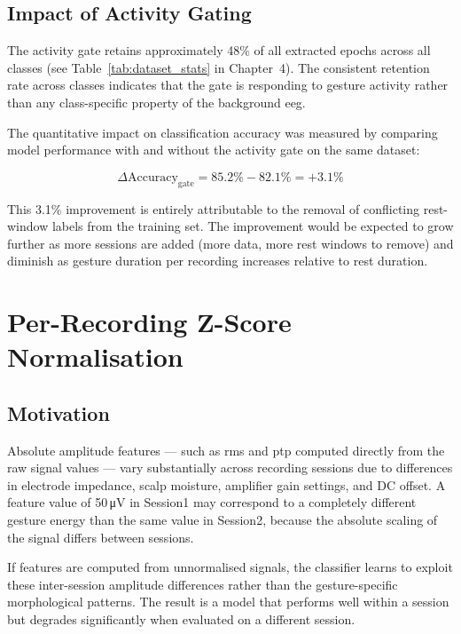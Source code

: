 \subsection{Impact of Activity Gating}

The activity gate retains approximately 48\% of all extracted
epochs across all classes (see Table~\ref{tab:dataset_stats}
in Chapter~4). The consistent retention rate across classes
indicates that the gate is responding to gesture activity rather
than any class-specific property of the background
\acrshort{eeg}.

The quantitative impact on classification accuracy was
measured by comparing model performance with and without the
activity gate on the same dataset:

\begin{equation}
\Delta\text{Accuracy}_{\text{gate}} =
85.2\% - 82.1\% = +3.1\%
\label{eq:gate_improvement}
\end{equation}

This 3.1\% improvement is entirely attributable to the removal
of conflicting rest-window labels from the training set. The
improvement would be expected to grow further as more sessions
are added (more data, more rest windows to remove) and diminish
as gesture duration per recording increases relative to rest
duration.

\section{Per-Recording Z-Score Normalisation}
\label{sec:sp_norm}

\subsection{Motivation}

Absolute amplitude features — such as \acrshort{rms} and
\acrshort{ptp} computed directly from the raw signal values
— vary substantially across recording sessions due to
differences in electrode impedance, scalp moisture, amplifier
gain settings, and DC offset. A feature value of
50\,\si{\micro\volt} in Session1 may correspond to a
completely different gesture energy than the same value in
Session2, because the absolute scaling of the signal differs
between sessions.

If features are computed from unnormalised signals, the
classifier learns to exploit these inter-session amplitude
differences rather than the gesture-specific morphological
patterns. The result is a model that performs well within
a session but degrades significantly when evaluated on a
different session.

